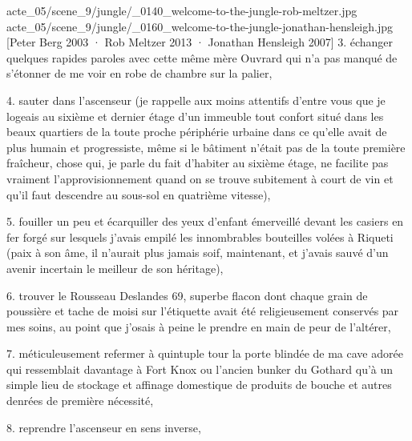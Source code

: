 %
%
%
{acte_05/scene_9/jungle/_0140_welcome-to-the-jungle-rob-meltzer.jpg}
{acte_05/scene_9/jungle/_0160_welcome-to-the-jungle-jonathan-hensleigh.jpg}
[Peter Berg \textup{2003} · Rob Meltzer \textup{2013} · Jonathan Hensleigh \textup{2007}]%
%
3. échanger quelques rapides paroles avec cette même mère Ouvrard qui n’a pas manqué de s’étonner de me voir en robe de chambre sur la palier,

4. sauter dans l’ascenseur (je rappelle aux moins attentifs d’entre vous que je logeais au sixième et dernier étage d’un immeuble tout confort situé dans les beaux quartiers de la toute proche périphérie urbaine dans ce qu’elle avait de plus humain et progressiste, même si le bâtiment n’était pas de la toute première fraîcheur, chose qui, je parle du fait d’habiter au sixième étage, ne facilite pas vraiment l’approvisionnement quand on se trouve subitement à court de vin et qu’il faut descendre au sous-sol en quatrième vitesse),

5. fouiller un peu et écarquiller des yeux d’enfant émerveillé devant les casiers en fer forgé sur lesquels j’avais empilé les innombrables bouteilles volées à Riqueti (paix à son âme, il n’aurait plus jamais soif, maintenant, et j’avais sauvé d’un avenir incertain le meilleur de son héritage),

6. trouver le Rousseau Deslandes 69, superbe flacon dont chaque grain de poussière et tache de moisi sur l’étiquette avait été religieusement conservés par mes soins, au point que j’osais à peine le prendre en main de peur de l’altérer,

7. méticuleusement refermer à quintuple tour la porte blindée de ma cave adorée qui ressemblait davantage à Fort Knox ou l’ancien bunker du Gothard qu’à un simple lieu de stockage et affinage domestique de produits de bouche et autres denrées de première nécessité,

8. reprendre l’ascenseur en sens inverse,

